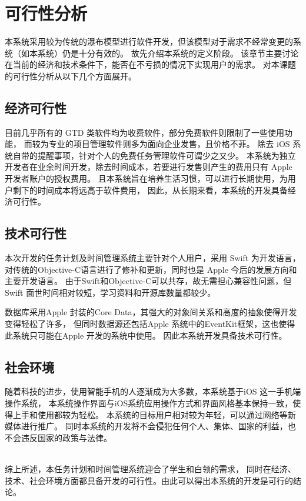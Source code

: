 \chapter{可行性分析}
本系统采用较为传统的瀑布模型进行软件开发，但该模型对于需求不经常变更的系统（如本系统）仍是十分有效的。
故先介绍本系统的定义阶段。
该章节主要讨论在当前的经济和技术条件下，能否在不亏损的情况下实现用户的需求。
对本课题的可行性分析从以下几个方面展开。
\section{经济可行性}
目前几乎所有的 GTD 类软件均为收费软件，部分免费软件则限制了一些使用功能，
而较为专业的项目管理软件则多为面向企业发售，且价格不菲。
除去 iOS 系统自带的提醒事项，针对个人的免费任务管理软件可谓少之又少。
本系统为独立开发者在业余时间开发，除去时间成本，若要进行发售则产生的费用只有 Apple 开发者账户的授权费用。
且本系统旨在培养生活习惯，可以进行长期使用，为用户剩下的时间成本将远高于软件费用，
因此，从长期来看，本系统的开发具备经济可行性。

\section{技术可行性}
本次开发的任务计划及时间管理系统主要针对个人用户，采用 Swift 为开发语言，
对传统的Objective-C语言进行了修补和更新，同时也是 Apple 今后的发展方向和主要开发语言。
由于Swift和Objective-C可以共存，故无需担心兼容性问题，但 Swift 面世时间相对较短，学习资料和开源库数量都较少。

数据库采用Apple 封装的Core Data，其强大的对象间关系和高度的抽象使得开发变得轻松了许多，
但同时数据源还包括Apple 系统中的EventKit框架，这也使得此系统只可能在Apple 开发的系统中使用。
因此本系统开发具备技术可行性。

\section{社会环境}
随着科技的进步，使用智能手机的人逐渐成为大多数，本系统基于iOS 这一手机端操作系统，
本系统操作界面与iOS系统应用操作方式和界面风格基本保持一致，使得上手和使用都较为轻松。
本系统的目标用户相对较为年轻，可以通过网络等新媒体进行推广。
同时本系统的开发将不会侵犯任何个人、集体、国家的利益，也不会违反国家的政策与法律。

~\\

综上所述，本任务计划和时间管理系统迎合了学生和白领的需求，
同时在经济、技术、社会环境方面都具备开发的可行性。由此可以得出本系统的开发是可行的结论。